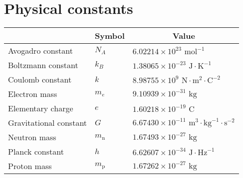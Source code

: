 \documentclass[../main.tex]{subfiles}
\begin{document}
\section*{Physical constants}
\begin{center}
    \begin{tabular}{|l|l|l|}
        \hline
        \rowcolor{gray!20}
        \multicolumn{1}{|c|}{\bfseries Quantity} & \multicolumn{1}{c|}{\bfseries Symbol} & \multicolumn{1}{c|}{\bfseries Value}                                     \\
        \hline
        \hline
        Avogadro constant                        & $N_A$                                 & $6.02214\times 10^{23}\text{ mol}^{-1}$                                  \\
        \hline
        Boltzmann constant                       & $k_B$                                 & $1.38065\times 10^{-23}\text{ J}\cdot\text{K}^{-1}$                      \\
        \hline
        Coulomb constant                         & $k$                                   & $8.98755\times 10^9\text{ N}\cdot\text{m}^2\cdot\text{C}^{-2}$           \\
        \hline
        Electron mass                            & $m_e$                                 & $9.10939\times 10^{-31}\text{ kg}$                                       \\
        \hline
        Elementary charge                        & $e$                                   & $1.60218\times 10^{-19}\text{ C}$                                        \\
        \hline
        Gravitational constant                   & $G$                                   & $6.67430\times 10^{-11}\text{ m}^3\cdot\text{kg}^{-1}\cdot\text{s}^{-2}$ \\
        \hline
        Neutron mass                             & $m_\text{n}$                          & $1.67493\times 10^{-27}\text{ kg}$                                       \\
        \hline
        Planck constant                          & $h$                                   & $6.62607\times 10^{-34}\text{ J}\cdot\text{Hz}^{-1}$                     \\
        \hline
        Proton mass                              & $m_\text{p}$                          & $1.67262\times 10^{-27}\text{ kg}$                                       \\

\end{tabular}
\end{center}
\end{document}
